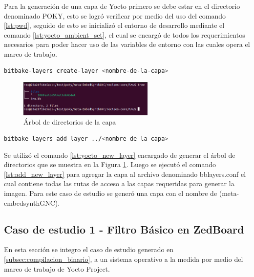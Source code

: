 Para la generación de una capa de Yocto primero se debe estar en el directorio denominado POKY, esto se logró verificar por medio del uso del comando \ref{lst:pwd}, seguido de esto se inicializó el entorno de desarrollo mediante el comando \ref{lst:yocto_ambient_set}, el cual se encargó de todos los requerimientos necesarios para poder hacer uso de las variables de entorno con las cuales opera el marco de trabajo.

\begin{lstlisting}[language=bash, caption={Generar nueva capa, Yocto }, label=lst:yocto_new_layer]
    bitbake-layers create-layer <nombre-de-la-capa>
\end{lstlisting}

\begin{figure}[h!]
    \centering
    \includegraphics[width=0.6\textwidth]{fig/Capitulo5/Caso_de_estudio_IMU/retornos_consola/Screenshot from 2024-10-31 20-35-20.png}
    \caption{Árbol de directorios de la capa}
    \label{fig:arbol_capa_custom_yocto}
\end{figure}

\begin{lstlisting}[language=bash, caption={Agregar nueva capa, Yocto }, label=lst:add_new_layer]
    bitbake-layers add-layer ../<nombre-de-la-capa>
\end{lstlisting}

Se utilizó el comando \ref{lst:yocto_new_layer} encargado de generar el árbol de directorios que se muestra en la Figura \ref{fig:arbol_capa_custom_yocto}. Luego se ejecutó el comando \ref{lst:add_new_layer} para agregar la capa al archivo denominado bblayers.conf el cual contiene todas las rutas de acceso a las capas requeridas para generar la imagen. Para este caso de estudio se generó una capa con el nombre de (meta-embedsynthGNC).


\subsection{Caso de estudio 1 - Filtro Básico en ZedBoard}

En esta sección se integro el caso de estudio generado en \ref{subsec:compilacion_binario}, a un sistema operativo a la medida por medio del marco de trabajo de Yocto Project.

